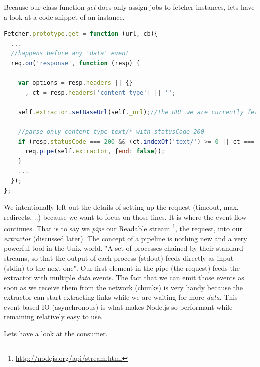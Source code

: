 Because our class function \emph{get} does only assign jobs to fetcher instances, lets have a look at a code snippet of an instance.

\begin{lstlisting}[language=JavaScript]
Fetcher.prototype.get = function (url, cb){
  ...
  //happens before any 'data' event
  req.on('response', function (resp) {

    var options = resp.headers || {}
      , ct = resp.headers['content-type'] || '';

    self.extractor.setBaseUrl(self._url);//the URL we are currently fetching

    //parse only content-type text/* with statusCode 200
    if (resp.statusCode === 200 && (ct.indexOf('text/') >= 0 || ct === '')) {
      req.pipe(self.extractor, {end: false});
    }
    ...
  });
};
\end{lstlisting}

We intentionally left out the details of setting up the request (timeout, max. redirects, ..) because we want to focus on those lines. It is where the event flow continues. That is to say we \emph{pipe} our Readable stream \footnote{\url{http://nodejs.org/api/stream.html}}, the request, into our \emph{extractor} (discussed later). The concept of a pipeline is nothing new and a very powerful tool in the Unix world. "A set of processes chained by their standard streams, so that the output of each process (stdout) feeds directly as input (stdin) to the next one"\cite{wiki:pipeline_unix}. Our first element in the pipe (the request) feeds the extractor with multiple \emph{data} events. The fact that we can emit those events as soon as we receive them from the network (chunks) is very handy because the extractor can start extracting links while we are waiting for more \emph{data}. This event based IO (asynchronous) is what makes Node.js so performant while remaining relatively easy to use.

Lets have a look at the consumer.

